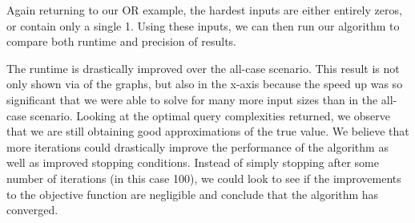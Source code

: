 Again returning to our OR example, the hardest inputs are
either entirely zeros, or contain only a single 1. 
Using these inputs, we can then run our algorithm to 
compare both runtime and precision of results.

The runtime is drastically improved over the all-case scenario. 
This result is not only shown via  of the graphs, 
but also in the x-axis because the speed up was so 
significant that we were able to solve for many more 
input sizes than in the all-case scenario. 
Looking at the optimal query complexities returned, 
we observe that we are still obtaining good 
approximations of the true value. 
We believe that more iterations could drastically 
improve the performance of the algorithm as well as 
improved stopping conditions. Instead of simply stopping 
after some number of iterations (in this case 100), 
we could look to see if the improvements to the objective 
function are negligible and conclude that the algorithm has converged.
